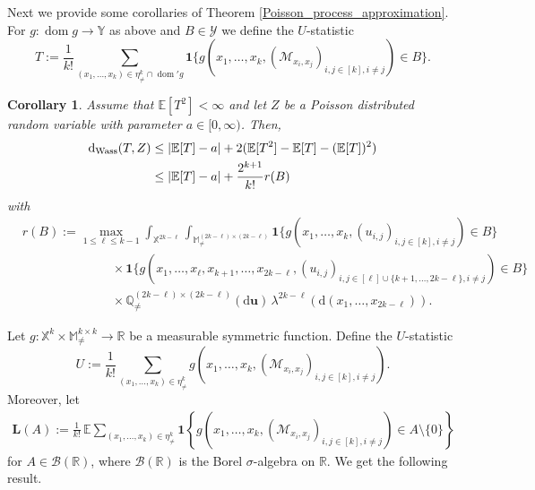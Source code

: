 \documentclass{article}
\newtheorem{cor}[theorem]{Corollary}
\theoremstyle{definition}
\numberwithin{equation}{section}
\theoremstyle{remark}
\begin{document}
Next we provide some corollaries of Theorem \ref{Poisson_process_approximation}. For $g: \operatorname{dom} g \to\mathbb{Y}$ as above and $B\in\mathcal{Y}$ we define the $U$-statistic
$$
T:=\frac{1}{k!}\sum_{(x_1,\ldots,x_k)\in\eta^k_{\neq}\cap \operatorname{dom}'g} \mathbf{1}\{g(x_1,\ldots,x_k,(\mathcal{M}_{x_i,x_j})_{i,j\in[k],i\neq j})\in B\}.
$$

\begin{cor}\label{cor:Poisson_approximation}
Assume that $\mathbb{E}[T^2]<\infty$ and let $Z$ be a Poisson distributed random variable with parameter $a\in[0,\infty)$. Then,
\begin{align*}
	\mathrm{d}_{\rm Wass}(T,Z) & \leq |\mathbb{E}[T]-a| + 2 ( \mathbb{E}[T^2]- \mathbb{E}[T] -(\mathbb{E}[T])^2 ) \\
& \leq |\mathbb{E}[T]-a| + \frac{2^{k+1}}{k!} r(B)
\end{align*}
with
\begin{align*}
  &  r(B) := \max_{1 \leq \ell \leq k-1} 
\int_{\mathbb{X}^{2k-\ell}} \int_{\mathbb{M}^{(2k-\ell)\times (2k-\ell)}_{\neq}}  
\mathbf{1}\big\{ g({x}_1, \ldots, {x}_k , (u_{i,j})_{i,j\in[k],i\neq j} ) \in B \big\}  \\
&  \hspace{3cm} \times \mathbf{1}\big\{ g({x}_1, \ldots, {x}_\ell, {x}_{k+1}, \ldots, {x}_{2k-\ell}, (u_{i,j})_{i,j\in [\ell]\cup\{k+1,\ldots,2k-\ell\}, i\neq j} ) \in B \big\} \\
& \hspace{3cm} \times  \mathbb{Q}^{(2k-\ell)\times(2k-\ell)}_{\neq} (\mathrm{d}\mathbf{u}) \, \lambda^{2k-\ell}(\mathrm{d}(x_1,\ldots,x_{2k-\ell})).
\end{align*}  
\end{cor}


Let $g: \mathbb{X}^k\times\mathbb{M}^{k\times k}_{\neq}\to\mathbb{R}$ be a measurable symmetric function. Define the $U$-statistic
\begin{equation}\label{definition_U}
	U := \frac{1}{k!}\sum_{(x_1,\ldots,x_k)\in\eta^k_{\neq}} g(x_1,\ldots,x_k,(\mathcal{M}_{x_i,x_j})_{i,j\in[k],i\neq j}). 
\end{equation}
Moreover, let
\begin{align*}
\mathbf{L}(A) := \frac{1}{k!} \, \mathbb{E} \sum_{(x_1, \ldots, x_k) \in \eta_{\neq}^k} 
\mathbf{1}\left\{ g(x_1, \ldots, x_k, (\mathcal{M}_{x_i,x_j})_{i,j\in[k], i \neq j}) \in A \setminus \{0\} \right\}
\end{align*}
for $A \in \mathcal{B}(\mathbb{R})$, where $\mathcal{B}(\mathbb{R})$ is the Borel $\sigma$-algebra on $\mathbb{R}$. We get the following result.
\end{document}
